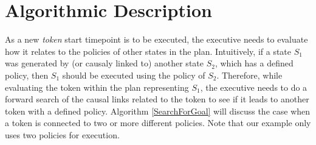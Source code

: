 %
%
%
%
%


\section{Algorithmic Description}
\label{sec:algo}


As a new {\em token} start timepoint is to be executed, the executive 
needs to evaluate how it relates
to the policies of other states in the plan. Intuitively, if a state
$S_1$ was generated by (or causaly linked to) another state $S_2$, which has a defined
policy, then $S_1$ should be executed using the policy of
$S_2$. Therefore, while evaluating the token within the plan
representing $S_1$, the executive needs to do a forward search of the
causal links related to the token to see if it leads to another token
with a defined policy. Algorithm \ref{SearchForGoal} will discuss the
case when a token is connected to two or more different policies. Note
that our example only uses two policies for execution.  %



